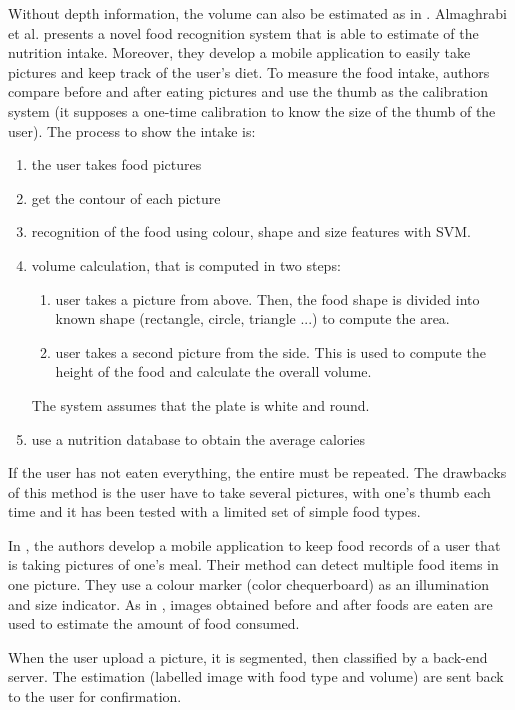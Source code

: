 Without depth information, the volume can also be estimated as in \cite{Almaghrabi2012a}. Almaghrabi et al. presents a novel food recognition system that is able to estimate of the nutrition intake. Moreover, they develop a mobile application to easily take pictures and keep track of the user's diet. To measure the food intake, authors compare before and after eating pictures and use the thumb as the calibration system (it supposes a one-time calibration to know the size of the thumb of the user).
The process to show the intake is:
\begin{enumerate}
    \item the user takes food pictures
    \item get the contour of each picture
    \item recognition of the food using colour, shape and size features with SVM.
    \item volume calculation, that is computed in two steps:
    \begin{enumerate}
        \item user takes a picture from above. Then, the food shape is divided into known shape (rectangle, circle, triangle ...) to compute the area.
        \item user takes a second picture from the side. This is used to compute the height of the food and calculate the overall volume.
    \end{enumerate}
    The system assumes that the plate is white and round.
    \item use a nutrition database to obtain the average calories
\end{enumerate}
If the user has not eaten everything, the entire must be repeated.
The drawbacks of this method is the user have to take several pictures, with one's thumb each time and it has been tested with a limited set of simple food types.

%
%

In \cite{Zhu2010}, the authors develop a mobile application to keep food records of a user that is taking pictures of one's meal. Their method can detect multiple food items in one picture. They use a colour marker (color chequerboard) as an illumination and size indicator.
As in \cite{Almaghrabi2012a}, images obtained before and after foods are eaten are used to estimate the amount of food consumed.

When the user upload a picture, it is segmented, then classified by a back-end server. The estimation (labelled image with food type and volume) are sent back to the user for confirmation.

